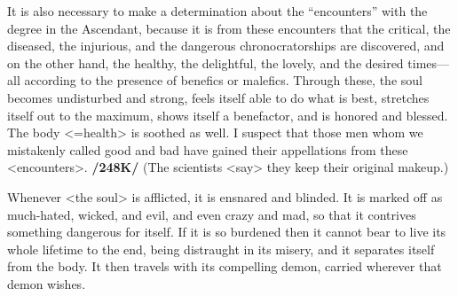 It  is also necessary to make a determination about the “encounters” with the degree in the Ascendant, because it is from these encounters that the critical, the diseased, the injurious, and the dangerous chronocratorships are discovered, and on the other hand, the healthy, the delightful, the lovely, and the desired times—all according to the presence of benefics or malefics. Through these, the soul becomes undisturbed and strong, feels itself able to do what is best, stretches itself out to the maximum, shows itself a benefactor, and is honored and blessed. The body <=health> is soothed as well. I suspect that those men whom we mistakenly called good and bad have gained their appellations from these <encounters>. \textbf{/248K/} (The scientists <say> they keep their original makeup.) 

Whenever <the soul> is afflicted, it is ensnared and blinded. It is marked off as much-hated, wicked, and evil, and even crazy and mad, so that it contrives something dangerous for itself. If it is so burdened then it cannot bear to live its whole lifetime to the end, being distraught in its misery, and it separates itself from the body. It then travels with its compelling demon, carried wherever that demon wishes.
\newpage
